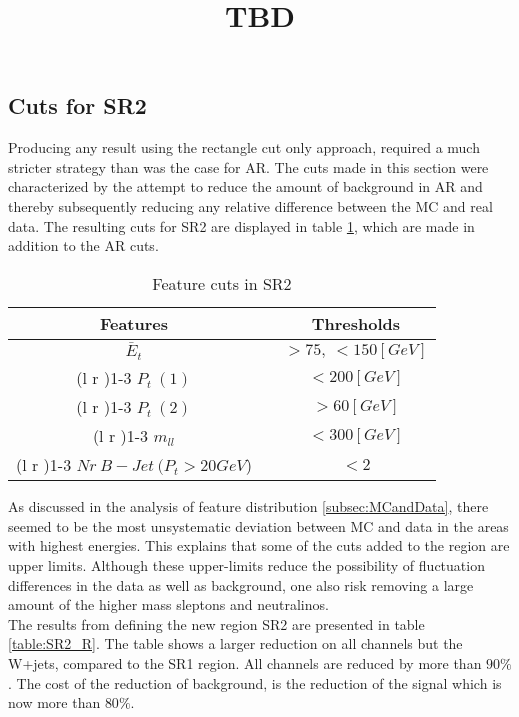\documentclass{article}
\begin{document}
\subsection{Cuts for SR2}
Producing any result using the rectangle cut only approach, required a much stricter strategy than was the case for AR. The cuts made in this section were characterized by the attempt to reduce the amount of background in AR and thereby subsequently reducing any relative difference between the MC and real data. The resulting cuts for SR2 are displayed in table \ref{table:SR2_RES}, which are made in addition to the AR cuts. \\
\bgroup
\title{TBD}
{\tabcolsep=20pt
\begin{table}
    \caption{Feature cuts in SR2}
    \label{table:SR2_RES}
    \centering 
    \begin{threeparttable}
    \begin{tabular}{ccc}
    \textbf{Features} & & \textbf{Thresholds}\\
     \midrule\midrule
    $\bar{E}_t$   & &  $ > 75, \ < 150[GeV]$  \\%
    \cmidrule(l  r ){1-3}
     $P_t \ (1)$ & &  $< 200[GeV]$  \\ 
    \cmidrule(l r ){1-3}
     $P_t \ (2)$ & & $> 60[GeV]$  \\ 
    \cmidrule(l r ){1-3}
    $m_{ll}$ & & $< 300[GeV]$  \\
    \cmidrule(l r ){1-3}
    $Nr\ B-Jet\  (P_t>20GeV$) & & $< 2$  \\ 
    \midrule\midrule
    \end{tabular}
    \end{threeparttable}
\end{table}
}
\egroup
As discussed in the analysis of feature distribution \ref{subsec:MCandData}, there seemed to be the most unsystematic deviation between MC and data in the areas with highest energies. This explains that some of the cuts added to the region are upper limits. Although these upper-limits reduce the possibility of fluctuation differences in the data as well as background, one also risk removing a large amount of the higher mass sleptons and neutralinos. 
\\
The results from defining the new region SR2 are presented in table \ref{table:SR2_R}. The table shows a larger reduction on all channels but the W+jets, compared to the SR1 region. All channels are reduced by more than $90\%$. The cost of the reduction of background, is the reduction of the signal which is now more than $80\%$.
\end{document}
